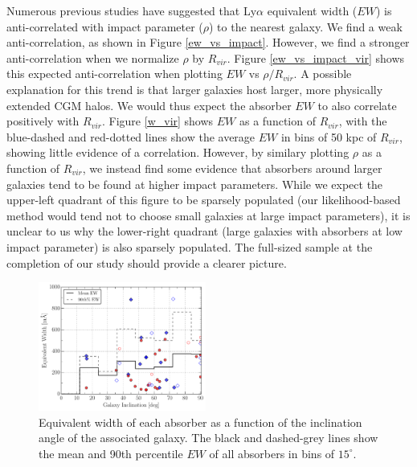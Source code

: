 \documentclass[twocolumn,tighten]{aastex6}
\begin{document}
Numerous previous studies have suggested that Ly$\alpha$ equivalent width ($EW$) is anti-correlated with impact parameter ($\rho$) to the nearest galaxy. We find a weak anti-correlation, as shown in Figure \ref{ew_vs_impact}. However, we find a stronger anti-correlation when we normalize $\rho$ by $R_{vir}$. Figure \ref{ew_vs_impact_vir} shows this expected anti-correlation when plotting $EW$ vs $\rho/R_{vir}$. A possible explanation for this trend is that larger galaxies host larger, more physically extended CGM halos. We would thus expect the absorber $EW$ to also correlate positively with $R_{vir}$. Figure \ref{w_vir} shows $EW$ as a function of $R_{vir}$, with the blue-dashed and red-dotted lines show the average $EW$ in bins of 50 kpc of $R_{vir}$, showing little evidence of a correlation. However, by similary plotting $\rho$ as a function of $R_{vir}$, we instead find some evidence that absorbers around larger galaxies tend to be found at higher impact parameters. While we expect the upper-left quadrant of this figure to be sparsely populated (our likelihood-based method would tend not to choose small galaxies at large impact parameters), it is unclear to us why the lower-right quadrant (large galaxies with absorbers at low impact parameter) is also sparsely populated. The full-sized sample at the completion of our study should provide a clearer picture.


\begin{figure}[h!]
        \centering
        \includegraphics[width=0.49\textwidth]{fig8.pdf}
        \caption{\small{Equivalent width of each absorber as a function of the inclination angle of the associated galaxy. The black and dashed-grey lines show the mean and 90th percentile $EW$ of all absorbers in bins of $15^{\circ}$.}}
        \label{ew_vs_inclination}
        \vspace{2pt}
\end{figure}
\end{document}

